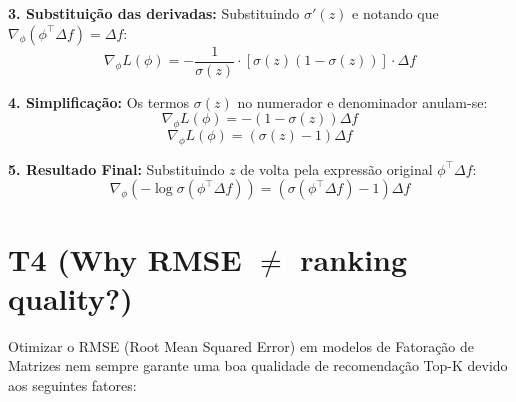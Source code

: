 \textbf{3. Substituição das derivadas:}
Substituindo $\sigma'(z)$ e notando que $\nabla_{\phi} (\phi^\top \Delta f) = \Delta f$:
\begin{equation}
\nabla_{\phi} L(\phi) = -\frac{1}{\sigma(z)} \cdot \left[ \sigma(z)(1 - \sigma(z)) \right] \cdot \Delta f
\end{equation}

\textbf{4. Simplificação:}
Os termos $\sigma(z)$ no numerador e denominador anulam-se:
\begin{equation}
\nabla_{\phi} L(\phi) = -(1 - \sigma(z)) \Delta f
\end{equation}
\begin{equation}
\nabla_{\phi} L(\phi) = (\sigma(z) - 1) \Delta f
\end{equation}

\textbf{5. Resultado Final:}
Substituindo $z$ de volta pela expressão original $\phi^\top \Delta f$:
\begin{equation}
\nabla_{\phi} \left( -\log \sigma(\phi^\top \Delta f) \right) = \left( \sigma(\phi^\top \Delta f) - 1 \right) \Delta f
\end{equation}

\section*{T4 (Why RMSE $\neq$ ranking quality?)}

Otimizar o RMSE (Root Mean Squared Error) em modelos de Fatoração de Matrizes nem sempre garante uma boa qualidade de recomendação Top-K devido aos seguintes fatores:

